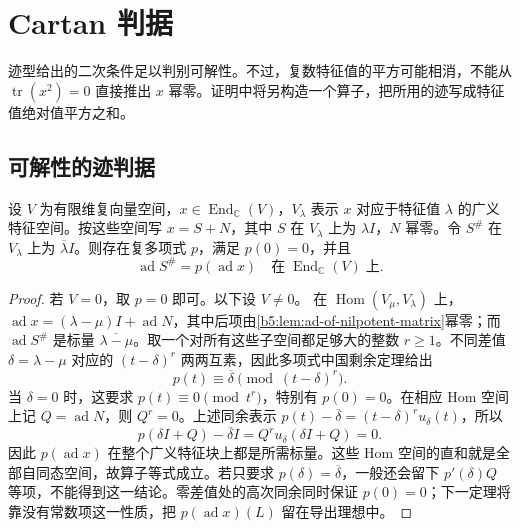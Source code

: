 
\section{Cartan 判据}
\label{b5:sec:1302}

%
%

迹型给出的二次条件足以判别可解性。不过，复数特征值的平方可能相消，不能从 \(\operatorname{tr}(x^2)=0\) 直接推出 \(x\) 幂零。证明中将另构造一个算子，把所用的迹写成特征值绝对值平方之和。

\subsection{可解性的迹判据}
\label{b5:subsec:1302:01}

\begin{lemma}[谱插值]\label{b5:lem:cartan-spectral-interpolation}
	设 \(V\) 为有限维复向量空间，\(x\in\operatorname{End}_{\mathbb C}(V)\)，\(V_\lambda\) 表示 \(x\) 对应于特征值 \(\lambda\) 的广义特征空间。按这些空间写 \(x=S+N\)，其中 \(S\) 在 \(V_\lambda\) 上为 \(\lambda I\)，\(N\) 幂零。令 \(S^\#\) 在 \(V_\lambda\) 上为 \(\overline\lambda I\)。则存在复多项式 \(p\)，满足 \(p(0)=0\)，并且
	\[
		\operatorname{ad}S^\#=p(\operatorname{ad}x) \quad\text{在}\;\operatorname{End}_{\mathbb C}(V)\;\text{上}.
	\]
\end{lemma}
\begin{proof}
	若 \(V=0\)，取 \(p=0\) 即可。以下设 \(V\ne0\)。 在 \(\operatorname{Hom}(V_\mu,V_\lambda)\) 上， \(\operatorname{ad}x=(\lambda-\mu)I+\operatorname{ad}N\)，其中后项由\cref{b5:lem:ad-of-nilpotent-matrix}幂零；而 \(\operatorname{ad}S^\#\) 是标量 \(\overline{\lambda-\mu}\)。取一个对所有这些子空间都足够大的整数 \(r\ge1\)。不同差值 \(\delta=\lambda-\mu\) 对应的 \((t-\delta)^r\) 两两互素，因此多项式中国剩余定理给出
	\[
		p(t)\equiv\overline\delta\pmod{(t-\delta)^r}.
	\]
	当 \(\delta=0\) 时，这要求 \(p(t)\equiv0\pmod{t^r}\)，特别有 \(p(0)=0\)。在相应 Hom 空间上记 \(Q=\operatorname{ad}N\)，则 \(Q^r=0\)。上述同余表示 \(p(t)-\overline\delta=(t-\delta)^r u_\delta(t)\)，所以
	\[
		p(\delta I+Q)-\overline\delta I =Q^r u_\delta(\delta I+Q)=0.
	\]
	因此 \(p(\operatorname{ad}x)\) 在整个广义特征块上都是所需标量。这些 Hom 空间的直和就是全部自同态空间，故算子等式成立。若只要求 \(p(\delta)=\overline\delta\)，一般还会留下 \(p'(\delta)Q\) 等项，不能得到这一结论。零差值处的高次同余同时保证 \(p(0)=0\)；下一定理将靠没有常数项这一性质，把 \(p(\operatorname{ad}x)(L)\) 留在导出理想中。
\end{proof}


